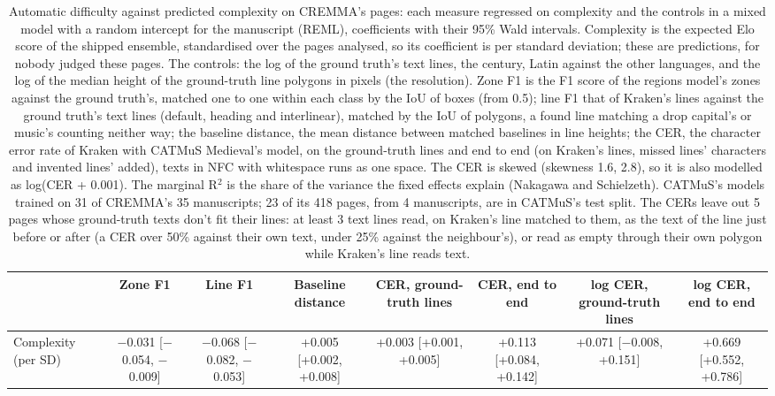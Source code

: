 \begin{table}[htbp]
  \centering
  \caption{Automatic difficulty against predicted complexity on CREMMA's pages: each measure regressed on complexity and the controls in a mixed model with a random intercept for the manuscript (REML), coefficients with their 95\% Wald intervals. Complexity is the expected Elo score of the shipped ensemble, standardised over the pages analysed, so its coefficient is per standard deviation; these are predictions, for nobody judged these pages. The controls: the log of the ground truth's text lines, the century, Latin against the other languages, and the log of the median height of the ground-truth line polygons in pixels (the resolution). Zone F1 is the F1 score of the regions model's zones against the ground truth's, matched one to one within each class by the IoU of boxes (from 0.5); line F1 that of Kraken's lines against the ground truth's text lines (default, heading and interlinear), matched by the IoU of polygons, a found line matching a drop capital's or music's counting neither way; the baseline distance, the mean distance between matched baselines in line heights; the CER, the character error rate of Kraken with CATMuS Medieval's model, on the ground-truth lines and end to end (on Kraken's lines, missed lines' characters and invented lines' added), texts in NFC with whitespace runs as one space. The CER is skewed (skewness 1.6, 2.8), so it is also modelled as log(CER + 0.001). The marginal R$^2$ is the share of the variance the fixed effects explain (Nakagawa and Schielzeth). CATMuS's models trained on 31 of CREMMA's 35 manuscripts; 23 of its 418 pages, from 4 manuscripts, are in CATMuS's test split. The CERs leave out 5 pages whose ground-truth texts don't fit their lines: at least 3 text lines read, on Kraken's line matched to them, as the text of the line just before or after (a CER over 50\% against their own text, under 25\% against the neighbour's), or read as empty through their own polygon while Kraken's line reads text.}
  \label{tab:difficulty_regression}
  \begin{tabular}{lccccccc}
    \toprule
     & Zone F1 & Line F1 & Baseline distance & CER, ground-truth lines & CER, end to end & log CER, ground-truth lines & log CER, end to end \\
    \midrule
    Complexity (per SD) & $-$0.031 [$-$0.054, $-$0.009] & $-$0.068 [$-$0.082, $-$0.053] & +0.005 [+0.002, +0.008] & +0.003 [+0.001, +0.005] & +0.113 [+0.084, +0.142] & +0.071 [$-$0.008, +0.151] & +0.669 [+0.552, +0.786] \\

\end{tabular}
\end{table}
